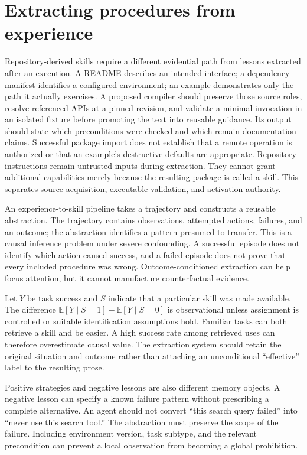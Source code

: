 \section{Extracting procedures from experience}\label{sec:C15:extraction}
Repository-derived skills require a different evidential path from lessons extracted after an execution. A README describes an intended interface; a dependency manifest identifies a configured environment; an example demonstrates only the path it actually exercises. A proposed compiler should preserve those source roles, resolve referenced APIs at a pinned revision, and validate a minimal invocation in an isolated fixture before promoting the text into reusable guidance. Its output should state which preconditions were checked and which remain documentation claims. Successful package import does not establish that a remote operation is authorized or that an example's destructive defaults are appropriate. Repository instructions remain untrusted inputs during extraction. They cannot grant additional capabilities merely because the resulting package is called a skill. This separates source acquisition, executable validation, and activation authority.

An experience-to-skill pipeline takes a trajectory and constructs a reusable abstraction. The trajectory contains observations, attempted actions, failures, and an outcome; the abstraction identifies a pattern presumed to transfer. This is a causal inference problem under severe confounding. A successful episode does not identify which action caused success, and a failed episode does not prove that every included procedure was wrong. Outcome-conditioned extraction can help focus attention, but it cannot manufacture counterfactual evidence.

Let $Y$ be task success and $S$ indicate that a particular skill was made available. The difference $\mathbb E[Y\mid S=1]-\mathbb E[Y\mid S=0]$ is observational unless assignment is controlled or suitable identification assumptions hold. Familiar tasks can both retrieve a skill and be easier. A high success rate among retrieved uses can therefore overestimate causal value. The extraction system should retain the original situation and outcome rather than attaching an unconditional ``effective'' label to the resulting prose.

Positive strategies and negative lessons are also different memory objects. A negative lesson can specify a known failure pattern without prescribing a complete alternative. An agent should not convert ``this search query failed'' into ``never use this search tool.'' The abstraction must preserve the scope of the failure. Including environment version, task subtype, and the relevant precondition can prevent a local observation from becoming a global prohibition.

